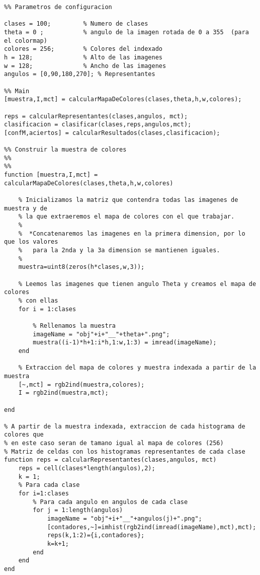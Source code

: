 \documentclass[es,gi]{ifirak}\usepackage[]{graphicx}\usepackage[]{color}
\begin{document}
\begin{lstlisting}
%% Parametros de configuracion

clases = 100;         % Numero de clases
theta = 0 ;           % angulo de la imagen rotada de 0 a 355  (para el colormap)
colores = 256;        % Colores del indexado
h = 128;              % Alto de las imagenes
w = 128;              % Ancho de las imagenes
angulos = [0,90,180,270]; % Representantes

%% Main
[muestra,I,mct] = calcularMapaDeColores(clases,theta,h,w,colores);

reps = calcularRepresentantes(clases,angulos, mct);
clasificacion = clasificar(clases,reps,angulos,mct);
[confM,aciertos] = calcularResultados(clases,clasificacion);

%% Construir la muestra de colores
%%
%%
function [muestra,I,mct] = calcularMapaDeColores(clases,theta,h,w,colores)

    % Inicializamos la matriz que contendra todas las imagenes de muestra y de
    % la que extraeremos el mapa de colores con el que trabajar.
    %
    %  *Concatenaremos las imagenes en la primera dimension, por lo que los valores
    %   para la 2nda y la 3a dimension se mantienen iguales.
    %
    muestra=uint8(zeros(h*clases,w,3));

    % Leemos las imagenes que tienen angulo Theta y creamos el mapa de colores
    % con ellas
    for i = 1:clases

        % Rellenamos la muestra
        imageName = "obj"+i+"__"+theta+".png";
        muestra((i-1)*h+1:i*h,1:w,1:3) = imread(imageName);
    end
    
    % Extraccion del mapa de colores y muestra indexada a partir de la muestra
    [~,mct] = rgb2ind(muestra,colores);     
    I = rgb2ind(muestra,mct);     

end

% A partir de la muestra indexada, extraccion de cada histograma de colores que
% en este caso seran de tamano igual al mapa de colores (256)
% Matriz de celdas con los histogramas representantes de cada clase
function reps = calcularRepresentantes(clases,angulos, mct)
    reps = cell(clases*length(angulos),2);
    k = 1;
    % Para cada clase
    for i=1:clases
        % Para cada angulo en angulos de cada clase
        for j = 1:length(angulos)
            imageName = "obj"+i+"__"+angulos(j)+".png";
            [contadores,~]=imhist(rgb2ind(imread(imageName),mct),mct);
            reps(k,1:2)={i,contadores};
            k=k+1;
        end 
    end
end


\end{lstlisting}
\end{document}
